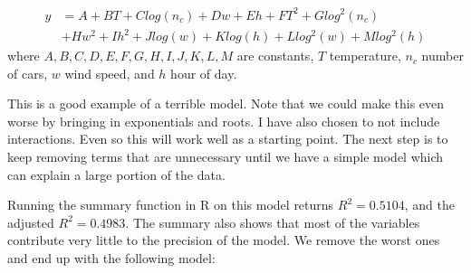 \documentclass[a4paper]{article}
\begin{document}
\begin{equation}
\begin{aligned}
y  &= A + BT + Clog(n_c)+ Dw + Eh + FT^2 + Glog^2(n_c) \\
   &+ Hw^2 + Ih^2 +Jlog(w)+Klog(h)+Llog^2(w)+Mlog^2(h)
\end{aligned}
\end{equation}
where $A,B,C,D,E,F,G,H,I,J,K,L,M$ are constants, $T$ temperature, $n_c$ number of cars, $w$ wind speed, and $h$ hour of day.

This is a good example of a terrible model. Note that we could make this even worse by bringing in exponentials and roots. I have also chosen to not include interactions. Even so this will work well as a starting point.
The next step is to keep removing terms that are unnecessary until we have a simple model which can explain a large portion of the data. 

Running the summary function in R on this model returns $R^2 = 0.5104$, and the adjusted $R^2 = 0.4983$. 
The summary also shows that most of the variables contribute very little to the precision of the model.
We remove the worst ones and end up with the following model:
\end{document}
